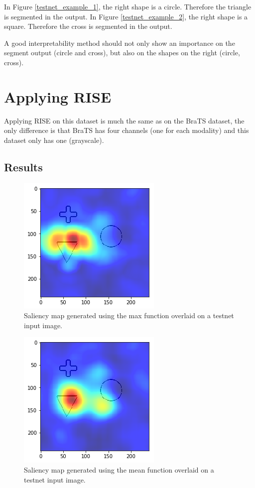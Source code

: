 In Figure \ref{testnet_example_1}, the right shape is a circle. Therefore the triangle is segmented in the output.
In Figure \ref{testnet_example_2}, the right shape is a square. Therefore the cross is segmented in the output.

A good interpretability method should not only show an importance on the segment output (circle and cross), but also on the shapes on the right (circle, cross).

\section{Applying RISE}

Applying RISE on this dataset is much the same as on the BraTS dataset, the only difference is that BraTS has four channels (one for each modality) and this dataset only has one (grayscale).

\subsection{Results}

\begin{figure}[H]
    \centering
    \includegraphics[width=.5\linewidth]{chapters/05_testnet/images/rise_max.png}
    \caption{Saliency map generated using the max function overlaid on a testnet input image.}
    \label{testnet_rise_mean}
\end{figure}

\begin{figure}[H]
    \centering
    \includegraphics[width=.5\linewidth]{chapters/05_testnet/images/rise_mean.png}
    \caption{Saliency map generated using the mean function overlaid on a testnet input image.}
    \label{testnet_rise_max}
\end{figure}

